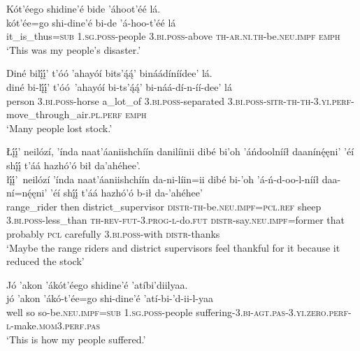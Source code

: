 \ea\label{ex:text9-14-9}
Kót’éego shidine’é bide ’áhoot’éé lá.\\
\gll kót’ée=go	shi-dine’é	bi-de	’á-hoo-t’éé	lá\\
     it\_is\_thus=\textsc{sub}	1.\textsc{sg}.\textsc{poss}-people	3.\textsc{bi}.\textsc{poss}-above	\textsc{th}-\textsc{ar}.\textsc{ni}.\textsc{th}-be.\textsc{neu}.\textsc{impf}	\textsc{emph}\\
\glt `This was my people's disaster.'
\z

\ea\label{ex:text9-14-10}
Diné bilį́į́’ t’óó ’ahayóí bits’ą́ą́’ bináádíníídee’ lá.\\
\gll diné	bi-lį́į́’	t’óó~{’ahayóí}	bi-ts’ą́ą́’	bi-náá-dí-n-íí-dee’	lá\\
     person	3.\textsc{bi}.\textsc{poss}-horse	a\_lot\_of	3.\textsc{bi}.\textsc{poss}-separated	3.\textsc{bi}.\textsc{poss}-\textsc{sitr}-\textsc{th}-\textsc{th}-3.\textsc{yi}.\textsc{perf}-move\_through\_air.\textsc{pl}.\textsc{perf}	\textsc{emph}\\
\glt `Many people lost stock.'
\z

\ea\label{ex:text9-14-11}
Łį́į́’ neilózí, ’índa naat’áaniishchíín danilíinii dibé bi’oh ’áńdoolnííł daanínę́ęni’ ’éí shį́į́ t’áá hazhó’ó bił da’ahéhee’.\\
\gll łį́į́’~{neilózí}	’índa	naat’áaniishchíín	da-ni-líin=ii	dibé	bi-’oh	’á-ń-d-oo-l-nííł	daa-ní=nę́ęni’	’éí	shį́į́	t’áá	hazhó’ó	b-ił	da-’ahéhee’\\
     range\_rider	then	district\_supervisor	\textsc{distr}-\textsc{th}-be.\textsc{neu}.\textsc{impf}=\textsc{pcl}.\textsc{ref}	sheep	3.\textsc{bi}.\textsc{poss}-less\_than	\textsc{th}-\textsc{rev}-\textsc{fut}-3.\textsc{prog}-\textsc{l}-do.\textsc{fut}	\textsc{distr}-say.\textsc{neu}.\textsc{impf}=former	that	probably	\textsc{pcl}	carefully	3.\textsc{bi}.\textsc{poss}-with	\textsc{distr}-thanks\\
\glt `Maybe the range riders and district supervisors feel thankful for it because it reduced the stock'
\z

\ea\label{ex:text9-15-1}
Jó ’akon ’ákót’éego shidine’é ’atíbi’diilyaa.\\
\gll jó	’akon	’ákó-t’ée=go	shi-dine’é	’atí-bi-’d-ii-l-yaa\\
     well	so	so-be.\textsc{neu}.\textsc{impf}=\textsc{sub}	1.\textsc{sg}.\textsc{poss}-people	suffering-3.\textsc{bi}-\textsc{agt}.\textsc{pas}-3.\textsc{yi}.\textsc{zero}.\textsc{perf}-\textsc{l}-make.\textsc{mom}3.\textsc{perf}.\textsc{pas}\\
\glt `This is how my people suffered.'
\z

